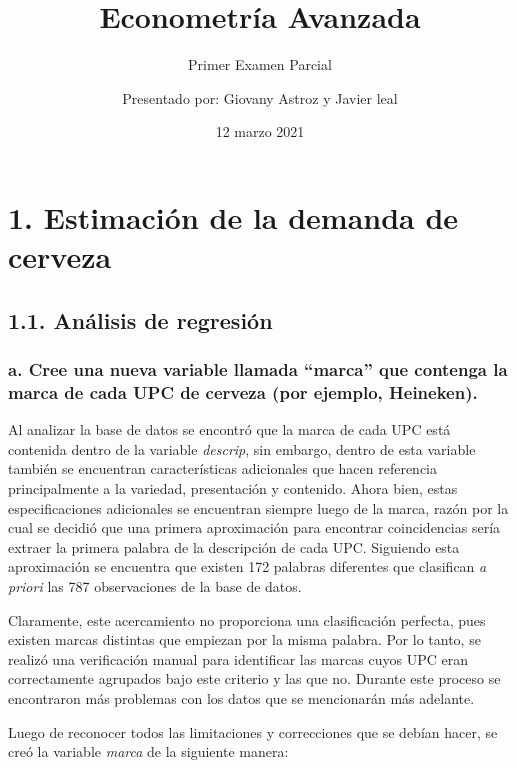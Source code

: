 \documentclass[
]{article}
\title{Econometría Avanzada}
\subtitle{Primer Examen Parcial}
\author{Presentado por: Giovany Astroz y Javier leal}
\date{12 marzo 2021}
\begin{document}
\maketitle

\hypertarget{estimaciuxf3n-de-la-demanda-de-cerveza}{%
\section{1. Estimación de la demanda de
cerveza}\label{estimaciuxf3n-de-la-demanda-de-cerveza}}

\hypertarget{anuxe1lisis-de-regresiuxf3n}{%
\subsection{1.1. Análisis de
regresión}\label{anuxe1lisis-de-regresiuxf3n}}

\hypertarget{a.-cree-una-nueva-variable-llamada-marca-que-contenga-la-marca-de-cada-upc-de-cerveza-por-ejemplo-heineken.}{%
\subsubsection{a. Cree una nueva variable llamada ``marca'' que contenga
la marca de cada UPC de cerveza (por ejemplo,
Heineken).}\label{a.-cree-una-nueva-variable-llamada-marca-que-contenga-la-marca-de-cada-upc-de-cerveza-por-ejemplo-heineken.}}

Al analizar la base de datos se encontró que la marca de cada UPC está
contenida dentro de la variable \emph{descrip}, sin embargo, dentro de
esta variable también se encuentran características adicionales que
hacen referencia principalmente a la variedad, presentación y contenido.
Ahora bien, estas especificaciones adicionales se encuentran siempre
luego de la marca, razón por la cual se decidió que una primera
aproximación para encontrar coincidencias sería extraer la primera
palabra de la descripción de cada UPC. Siguiendo esta aproximación se
encuentra que existen 172 palabras diferentes que clasifican \emph{a
priori} las 787 observaciones de la base de datos.

Claramente, este acercamiento no proporciona una clasificación perfecta,
pues existen marcas distintas que empiezan por la misma palabra. Por lo
tanto, se realizó una verificación manual para identificar las marcas
cuyos UPC eran correctamente agrupados bajo este criterio y las que no.
Durante este proceso se encontraron más problemas con los datos que se
mencionarán más adelante.

Luego de reconocer todos las limitaciones y correcciones que se debían
hacer, se creó la variable \emph{marca} de la siguiente manera:
\end{document}
